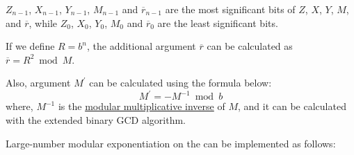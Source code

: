 \documentclass[main\_\_EN.tex]{subfiles}
\begin{document}
\begin{math}Z_{n-1}\end{math},
\begin{math}X_{n-1}\end{math},
\begin{math}Y_{n-1}\end{math},
\begin{math}M_{n-1}\end{math} and
\begin{math}\overline{r}_{n-1}\end{math} are the most significant bits of
\begin{math}Z\end{math},
\begin{math}X\end{math},
\begin{math}Y\end{math},
\begin{math}M\end{math}, and \begin{math}\overline{r}\end{math}, while
\begin{math}Z_{0}\end{math},
\begin{math}X_{0}\end{math},
\begin{math}Y_{0}\end{math},
\begin{math}M_{0}\end{math} and
\begin{math}\overline{r}_{0}\end{math} are the least significant bits.

If we define \begin{math}R = b^{n}\end{math}, the additional argument $\overline{r}$ can be calculated as \begin{math}\overline{r} = R^{2} \bmod M\end{math}.

Also, argument $M^{\prime}$ can be calculated using the formula below:
\[
 M^{\prime} = - M^{-1} \bmod b
\]
where, $M^{-1}$ is the \href{https://en.wikipedia.org/wiki/Modular\_multiplicative\_inverse}{modular multiplicative inverse} of $M$, and it can be calculated with the extended binary GCD algorithm.

Large-number modular exponentiation on the \chipname{} can be implemented as follows:
\end{document}
